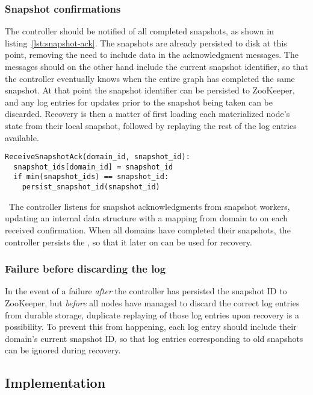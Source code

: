 \subsubsection{Snapshot confirmations}

The controller should be notified of all completed snapshots, as shown in
listing~\ref{lst:snapshot-ack}. The snapshots are already persisted to disk at
this point, removing the need to include data in the acknowledgment messages.
The messages should on the other hand include the current snapshot identifier,
so that the controller eventually knows when the entire graph has completed the
same snapshot. At that point the snapshot identifier can be persisted to
ZooKeeper, and any log entries for updates prior to the snapshot being taken can
be discarded. Recovery is then a matter of first loading each materialized
node's state from their local snapshot, followed by replaying the rest of the
log entries available.

\begin{listing}[H]
  \begin{verbatim}
ReceiveSnapshotAck(domain_id, snapshot_id):
  snapshot_ids[domain_id] = snapshot_id
  if min(snapshot_ids) == snapshot_id:
    persist_snapshot_id(snapshot_id)
  \end{verbatim}
  \caption{\
    The controller listens for snapshot acknowledgments from snapshot workers,
    updating an internal data structure with a mapping from domain to
    \code{snapshot\_id} on each received confirmation. When all domains have
    completed their snapshots, the controller persists the
    , so that it later on can be used for recovery.
  }\label{lst:snapshot-ack}
\end{listing}


\subsubsection{Failure before discarding the log}

In the event of a failure \textit{after} the controller has persisted the
snapshot ID to ZooKeeper, but \textit{before} all nodes have managed to discard
the correct log entries from durable storage, duplicate replaying of those log
entries upon recovery is a possibility. To prevent this from happening, each log
entry should include their domain's current snapshot ID, so that log entries
corresponding to old snapshots can be ignored during recovery.

\subsection{Implementation}

